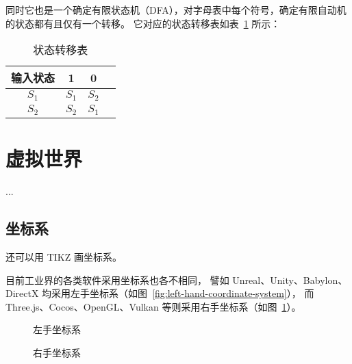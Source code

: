 同时它也是一个确定有限状态机（DFA），对字母表中每个符号，确定有限自动机的状态都有且仅有一个转移。
它对应的状态转移表如表~\ref{tab:fsm-state-example} 所示：

\begin{table}
  \centering
  \caption{状态转移表}
  \begin{tabular}{c|ccc}
    \toprule
    输入状态 & 1 & 0   \\
    \midrule
    $S_1$   & $S_1$ & $S_2$  \\
    $S_2$   & $S_2$ & $S_1$  \\
    \bottomrule
  \end{tabular}
  \label{tab:fsm-state-example}
\end{table}


\section{虚拟世界}

...

\subsection{坐标系}

还可以用 TIKZ 画坐标系。

目前工业界的各类软件采用坐标系也各不相同，
譬如 Unreal、Unity、Babylon、DirectX 均采用左手坐标系（如图~\ref{fig:left-hand-coordinate-system}），
而 Three.js、Cocos、OpenGL、Vulkan 等则采用右手坐标系（如图~\ref{fig:right-hand-coordinate-system}）。

\begin{figure}[htb]
  \centering
  \begin{minipage}[t]{.4\textwidth}
    \centering
    \caption{左手坐标系}
    \label{fig:left-hand-coordinate-system}
  \end{minipage}
  \begin{minipage}[t]{.4\textwidth}
    \centering
    \caption{右手坐标系}
    \label{fig:right-hand-coordinate-system}
  \end{minipage}
\end{figure}


